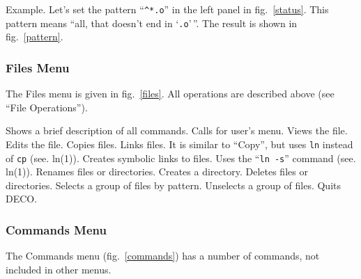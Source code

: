 Example. Let's set the pattern ``{\tt \^{}*.o}'' in the left panel
in fig.~\ref{status}. This pattern means ``all, that doesn't end
in `{\tt .o}'\,''. The result is shown in fig.~\ref{pattern}.


\subsubsection{Files Menu}

The Files menu is given in fig.~\ref{files}. All operations are
described above (see ``File Operations'').
 
\begin{example}
Shows a brief description of all commands.
Calls for user's menu.
Views the file.
Edits the file.
Copies files.
Links files. It is similar to ``Copy'', but uses {\tt ln}
instead of {\tt cp} (see. ln(1)).
Creates symbolic links to files. Uses the ``{\tt ln -s}'' command (see. ln(1)).
Renames files or directories.
Creates a directory.
Deletes files or directories.
Selects a group of files by pattern.
Unselects a group of files.
Quits DECO.
\end{example}


\subsubsection{Commands Menu}

The Commands menu (fig.~\ref{commands}) has a number of
commands, not included in other menus.
 

